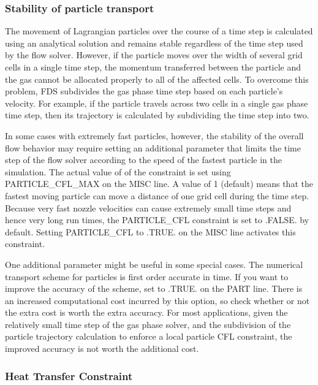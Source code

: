 \documentclass[11pt]{book}
\begin{document}
\subsubsection{Stability of particle transport}
\label{info:PART_Stability}

The movement of Lagrangian particles over the course of a time step is calculated using an analytical solution and remains stable regardless of the time step used by the flow solver. However, if the particle moves over the width of several grid cells in a single time step, the momentum transferred between the particle and the gas cannot be allocated properly to all of the affected cells. To overcome this problem, FDS subdivides the gas phase time step based on each particle's velocity. For example, if the particle travels across two cells in a single gas phase time step, then its trajectory is calculated by subdividing the time step into two.

In some cases with extremely fast particles, however, the stability of the overall flow behavior may require setting an additional parameter that limits the time step of the flow solver according to the speed of the fastest particle in the simulation.  The actual value of of the constraint is set using {\ct PARTICLE\_CFL\_MAX} on the {\ct MISC} line. A value of 1 (default) means that the fastest moving particle can move a distance of one grid cell during the time step. Because very fast nozzle velocities can cause extremely small time steps and hence very long run times, the {\ct PARTICLE\_CFL} constraint is set to {\ct .FALSE.} by default.  Setting {\ct PARTICLE\_CFL} to {\ct .TRUE.} on the {\ct MISC} line activates this constraint.

One additional parameter might be useful in some special cases. The numerical transport scheme for particles is first order accurate in time. If you want to improve the accuracy of the scheme, set  to {\ct .TRUE.} on the {\ct PART} line. There is an increased computational cost incurred by this option, so check whether or not the extra cost is worth the extra accuracy. For most applications, given the relatively small time step of the gas phase solver, and the subdivision of the particle trajectory calculation to enforce a local particle CFL constraint, the improved accuracy is not worth the additional cost.


\subsubsection{Heat Transfer Constraint}
\end{document}
